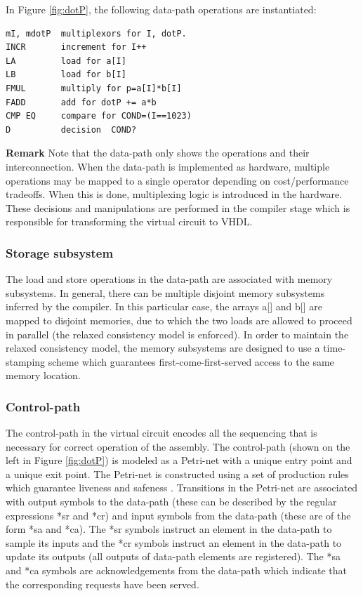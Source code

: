 \documentclass[conference]{IEEEtran}
\begin{document}
In Figure \ref{fig:dotP}, the following data-path operations
are instantiated:
\begin{verbatim}
mI, mdotP  multiplexors for I, dotP.
INCR       increment for I++
LA         load for a[I]
LB         load for b[I]
FMUL       multiply for p=a[I]*b[I]
FADD       add for dotP += a*b
CMP EQ     compare for COND=(I==1023)
D          decision  COND?
\end{verbatim}


\noindent
{\bf Remark}
Note that the data-path only shows the operations and their interconnection.
When the data-path is implemented as hardware, multiple operations may
be mapped to a single operator depending on cost/performance tradeoffs.  When
this is done, multiplexing logic is introduced in the hardware.  These
decisions and manipulations are performed in the compiler stage which is
responsible for transforming the virtual circuit to VHDL.

\subsubsection{Storage subsystem}

The load and store operations in the data-path
are associated with memory subsystems.  In general, there
can be multiple disjoint memory subsystems inferred by the
compiler.  In this particular case, the arrays a[] and b[] 
are mapped to disjoint memories, due to which the two
loads are allowed to proceed in parallel (the relaxed consistency
model is enforced).
In order to maintain the relaxed consistency model, the
memory subsystems are designed to use a time-stamping 
scheme which guarantees first-come-first-served access to
the same memory location.

\subsubsection{Control-path}


The control-path in the virtual circuit encodes
all the sequencing that is necessary for correct
operation of the assembly.
The control-path (shown on the left
in Figure \ref{fig:dotP}) is modeled as a Petri-net with
a unique entry point and a unique exit point.  The Petri-net
is constructed using a set of production rules which guarantee
liveness and safeness \cite{c:ahir_dsd2010}.  Transitions in the Petri-net
are associated with output symbols to the data-path (these can
be described by the regular expressions *sr and *cr)
and input symbols from the data-path (these are of the form *sa and
*ca).  The *sr symbols instruct an element in the data-path to
sample its inputs and the *cr symbols instruct an element in the
data-path to update its outputs (all outputs of data-path elements
are registered).  The *sa and *ca symbols are acknowledgements
from the data-path which indicate that the corresponding requests
have been served.  
\end{document}
